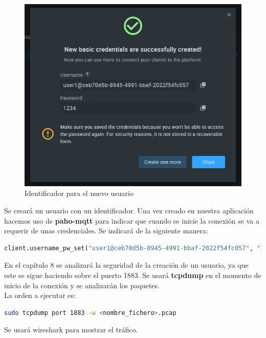 \begin{figure}[p]
    \centering
    \includegraphics[width=\linewidth]{imagenes/Captura de pantalla 2022-06-13 180337.png}
    \caption{Identificador para el nuevo usuario}
    \label{fig:figure12-imp}
\end{figure}

Se creará un usuario con un identificador. Una vez creado en nuestra aplicación hacemos uso de \textbf{paho-mqtt} para indicar que cuando se inicie la conexión se va a requerir de unas credenciales. Se indicará de la siguiente manera:


\begin{lstlisting}[language=Python]
client.username_pw_set("user1@ceb70d5b-8945-4991-bbaf-2022f54fc057", "1234")
\end{lstlisting}

En el capítulo 8 se analizará la seguridad de la creación de un usuario, ya que este se sigue haciendo sobre el puerto 1883. Se usará \textbf{tcpdump} en el momento de inicio de la conexión y se analizarán los paquetes. \\

La orden a ejecutar es:

\begin{lstlisting}[language=bash]
sudo tcpdump port 1883 -w <nombre_fichero>.pcap
\end{lstlisting}

Se usará wireshark para mostrar el tráfico.